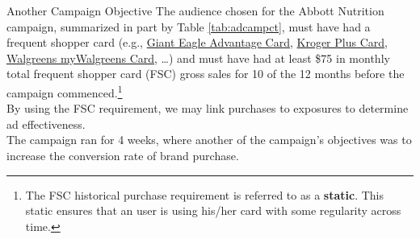 \documentclass[pdf]{beamer}
\newcommand{\empr}[1]{{\color{franklinblue}\textbf{#1}}}
\theoremstyle{remark}
\theoremstyle{definition}
\begin{document}
\begin{frame}[t]{Another Campaign Objective }
The audience chosen for the Abbott Nutrition campaign, summarized in part by Table  \ref{tab:adcampct}, must have had a frequent shopper card (e.g., \href{https://www.gianteagle.com/save/giant-eagle-advantage-card}{Giant Eagle Advantage Card}, \href{https://www.kroger.com/pr/free-membership}{Kroger Plus Card}, \href{https://www.walgreens.com/topic/promotion/mywalgreens.jsp}{Walgreens myWalgreens Card}, \ldots) and must have had at least \$75 in monthly total frequent shopper card (FSC) gross sales for 10 of the 12 months before the campaign commenced.\footnote{The FSC historical purchase requirement is referred to as a \empr{static}.  This static ensures that an user is using his/her card with some regularity across time.} \\
\vspace{1.5ex}
By using the FSC requirement, we may link purchases to exposures to determine ad effectiveness. \\
\vspace{1.5ex}
The campaign ran for 4 weeks, where another of the campaign's objectives was to increase the conversion rate of brand purchase.  \\
\end{frame}
\end{document}

